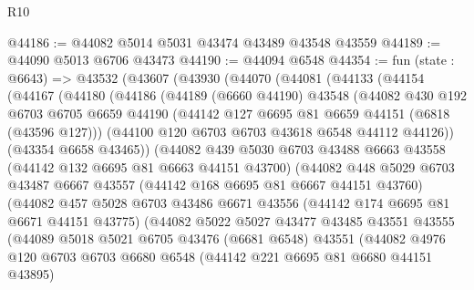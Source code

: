 \begin{lexlean}{R10}
\begin{coremodule}
@44186 := @44082 @5014 @5031 @43474 @43489 @43548 @43559
@44189 := @44090 @5013 @6706 @43473
@44190 := @44094 @6548
@44354 := fun (state : @6643) =>
  @43532
    (@43607
      (@43930
        (@44070
          (@44081
            (@44133
              (@44154
                (@44167
                  (@44180
                    (@44186
                      (@44189
                        (@6660 @44190)
                        @43548
                        (@44082
                          @430
                          @192
                          @6703
                          @6705
                          @6659
                          @44190
                          (@44142 @127 @6695 @81 @6659 @44151 (@6818 (@43596 @127)))
                          (@44100 @120 @6703 @6703 @43618 @6548 @44112 @44126))
                        (@43354 @6658 @43465))
                      (@44082
                        @439
                        @5030
                        @6703
                        @43488
                        @6663
                        @43558
                        (@44142 @132 @6695 @81 @6663 @44151 @43700)
                        (@44082
                          @448
                          @5029
                          @6703
                          @43487
                          @6667
                          @43557
                          (@44142 @168 @6695 @81 @6667 @44151 @43760)
                          (@44082
                            @457
                            @5028
                            @6703
                            @43486
                            @6671
                            @43556
                            (@44142 @174 @6695 @81 @6671 @44151 @43775)
                            (@44082
                              @5022
                              @5027
                              @43477
                              @43485
                              @43551
                              @43555
                              (@44089
                                @5018
                                @5021
                                @6705
                                @43476
                                (@6681 @6548)
                                @43551
                                (@44082
                                  @4976
                                  @120
                                  @6703
                                  @6703
                                  @6680
                                  @6548
                                  (@44142 @221 @6695 @81 @6680 @44151 @43895)

\end{coremodule}
\end{lexlean}
